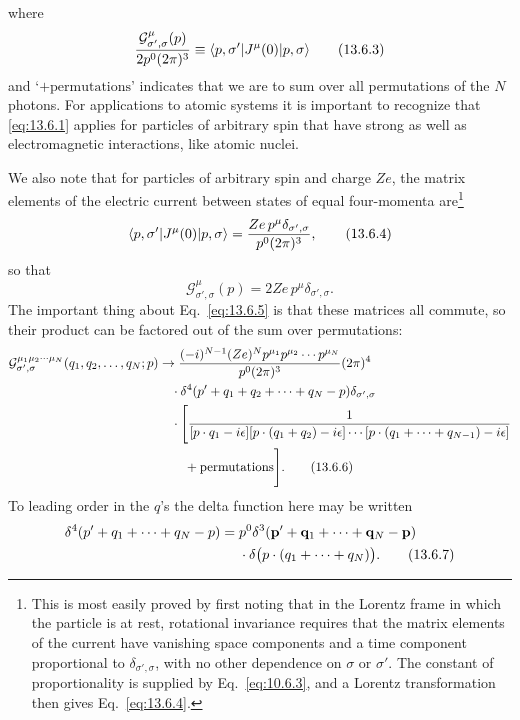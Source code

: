 where
\begin{equation}
\frac{\mathcal G^\mu_{\sigma',\sigma}(p)}{2p^0(2\pi)^3}
\equiv\langle p,\sigma'\rvert J^\mu(0)\lvert p,\sigma\rangle
\tag{13.6.3}\label{eq:13.6.3}
\end{equation}
and `$+\text{permutations}$' indicates that we are to sum over all permutations
of the $N$ photons. For applications to atomic systems it is important
to recognize that \eqref{eq:13.6.1} applies for particles of arbitrary spin that have
strong as well as electromagnetic interactions, like atomic nuclei.

We also note that for particles of arbitrary spin and charge $Ze$, the
matrix elements of the electric current between states of equal four-momenta are\footnote{This is most easily proved by first noting that in the Lorentz frame in which the particle is at
rest, rotational invariance requires that the matrix elements of the current have vanishing space
components and a time component proportional to $\delta_{\sigma',\sigma}$, with no other dependence on $\sigma$ or $\sigma'$.
The constant of proportionality is supplied by Eq.~\eqref{eq:10.6.3}, and a Lorentz transformation then
gives Eq.~\eqref{eq:13.6.4}.}
\begin{equation}
\langle p,\sigma'\rvert J^\mu(0)\lvert p,\sigma\rangle
=\frac{Ze\,p^\mu\delta_{\sigma',\sigma}}{p^0(2\pi)^3},
\tag{13.6.4}\label{eq:13.6.4}
\end{equation}
so that
\begin{equation}
\mathcal G^\mu_{\sigma',\sigma}(p)=2Ze\,p^\mu\delta_{\sigma',\sigma}.
\tag{13.6.5}\label{eq:13.6.5}
\end{equation}
The important thing about Eq.~\eqref{eq:13.6.5} is that these matrices all commute,
so their product can be factored out of the sum over permutations:
\begin{align}
\mathcal G^{\mu_1\mu_2\cdots\mu_N}_{\sigma',\sigma}
(q_1,q_2,\ldots,q_N;p)
&\to
\frac{(-i)^{N-1}(Ze)^N p^{\mu_1}p^{\mu_2}\cdots p^{\mu_N}}
{p^0(2\pi)^3}(2\pi)^4
\notag\\
&\quad\cdot
\delta^4(p'+q_1+q_2+\cdots+q_N-p)\delta_{\sigma',\sigma}
\notag\\
&\quad\cdot\Biggl[
\frac{1}{[p\cdot q_1-i\epsilon]
[p\cdot(q_1+q_2)-i\epsilon]\cdots
[p\cdot(q_1+\cdots+q_{N-1})-i\epsilon]}
\notag\\
&\qquad+\text{permutations}\Biggr].
\tag{13.6.6}\label{eq:13.6.6}
\end{align}
To leading order in the $q$'s the delta function here may be written
\begin{align}
\delta^4(p'+q_1+\cdots+q_N-p)={}&p^0
\delta^3(\mathbf p'+\mathbf q_1+\cdots+\mathbf q_N-\mathbf p)
\notag\\
&\cdot\delta\bigl(p\cdot(q_1+\cdots+q_N)\bigr).
\tag{13.6.7}\label{eq:13.6.7}
\end{align}
